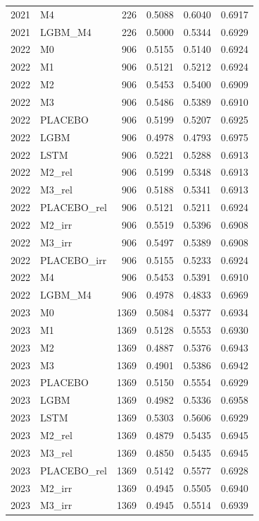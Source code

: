 \begin{tabular}{llrrrr}
2021 & M4 & 226 & 0.5088 & 0.6040 & 0.6917 \\
2021 & LGBM\_M4 & 226 & 0.5000 & 0.5344 & 0.6929 \\
2022 & M0 & 906 & 0.5155 & 0.5140 & 0.6924 \\
2022 & M1 & 906 & 0.5121 & 0.5212 & 0.6924 \\
2022 & M2 & 906 & 0.5453 & 0.5400 & 0.6909 \\
2022 & M3 & 906 & 0.5486 & 0.5389 & 0.6910 \\
2022 & PLACEBO & 906 & 0.5199 & 0.5207 & 0.6925 \\
2022 & LGBM & 906 & 0.4978 & 0.4793 & 0.6975 \\
2022 & LSTM & 906 & 0.5221 & 0.5288 & 0.6913 \\
2022 & M2\_rel & 906 & 0.5199 & 0.5348 & 0.6913 \\
2022 & M3\_rel & 906 & 0.5188 & 0.5341 & 0.6913 \\
2022 & PLACEBO\_rel & 906 & 0.5121 & 0.5211 & 0.6924 \\
2022 & M2\_irr & 906 & 0.5519 & 0.5396 & 0.6908 \\
2022 & M3\_irr & 906 & 0.5497 & 0.5389 & 0.6908 \\
2022 & PLACEBO\_irr & 906 & 0.5155 & 0.5233 & 0.6924 \\
2022 & M4 & 906 & 0.5453 & 0.5391 & 0.6910 \\
2022 & LGBM\_M4 & 906 & 0.4978 & 0.4833 & 0.6969 \\
2023 & M0 & 1369 & 0.5084 & 0.5377 & 0.6934 \\
2023 & M1 & 1369 & 0.5128 & 0.5553 & 0.6930 \\
2023 & M2 & 1369 & 0.4887 & 0.5376 & 0.6943 \\
2023 & M3 & 1369 & 0.4901 & 0.5386 & 0.6942 \\
2023 & PLACEBO & 1369 & 0.5150 & 0.5554 & 0.6929 \\
2023 & LGBM & 1369 & 0.4982 & 0.5336 & 0.6958 \\
2023 & LSTM & 1369 & 0.5303 & 0.5606 & 0.6929 \\
2023 & M2\_rel & 1369 & 0.4879 & 0.5435 & 0.6945 \\
2023 & M3\_rel & 1369 & 0.4850 & 0.5435 & 0.6945 \\
2023 & PLACEBO\_rel & 1369 & 0.5142 & 0.5577 & 0.6928 \\
2023 & M2\_irr & 1369 & 0.4945 & 0.5505 & 0.6940 \\
2023 & M3\_irr & 1369 & 0.4945 & 0.5514 & 0.6939 \\

\end{tabular}
